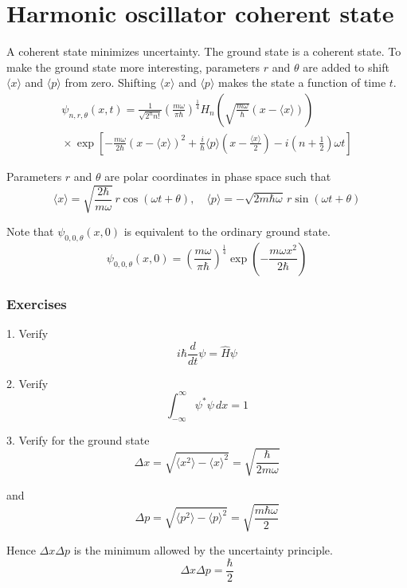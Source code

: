 

\section*{Harmonic oscillator coherent state}

A coherent state minimizes uncertainty.
The ground state is a coherent state.
To make the ground state more interesting, parameters $r$ and $\theta$ are added
to shift $\langle x\rangle$ and $\langle p\rangle$ from zero.
Shifting $\langle x\rangle$ and $\langle p\rangle$ makes the state a function of time $t$.
\begin{multline*}
\psi_{n,r,\theta}(x,t)
=\frac{1}{\sqrt{2^nn!}}
\left(\frac{m\omega}{\pi\hbar}\right)^\frac{1}{4}
H_n\left(\sqrt{\frac{m\omega}{\hbar}}\left(x-\langle x\rangle\right)\right)
\\{}\times
\exp\left[
-\frac{m\omega}{2\hbar}\left(x-\langle x\rangle\right)^2
+\frac{i}{\hbar}\langle p\rangle\left(x-\frac{\langle x\rangle}{2}\right)
-i\left(n+\frac{1}{2}\right)\omega t
\right]
\end{multline*}

Parameters $r$ and $\theta$ are polar coordinates in phase space such that
\begin{equation*}
\langle x\rangle=\sqrt{\frac{2\hbar}{m\omega}}\,r\cos(\omega t+\theta),\quad
\langle p\rangle=-\sqrt{2m\hbar\omega}\,r\sin(\omega t+\theta)
\end{equation*}

Note that $\psi_{0,0,\theta}(x,0)$ is equivalent to the ordinary ground state.
\begin{equation*}
\psi_{0,0,\theta}(x,0)=\left(\frac{m\omega}{\pi\hbar}\right)^\frac{1}{4}
\exp\left(-\frac{m\omega x^2}{2\hbar}\right)
\end{equation*}

\subsubsection*{Exercises}

1. Verify
\begin{equation*}
i\hbar\frac{d}{dt}\psi=\hat H\psi
\end{equation*}

2. Verify
\begin{equation*}
\int_{-\infty}^\infty\psi^*\psi\,dx=1
\end{equation*}

3. Verify for the ground state
\begin{equation*}
\Delta x=\sqrt{\langle x^2\rangle-\langle x\rangle^2}
=\sqrt{\frac{\hbar}{2m\omega}}
\end{equation*}

and
\begin{equation*}
\Delta p=\sqrt{\langle p^2\rangle-\langle p\rangle^2}
=\sqrt{\frac{m\hbar\omega}{2}}
\end{equation*}

Hence $\Delta x\Delta p$ is the minimum allowed by the uncertainty principle.
\begin{equation*}
\Delta x\Delta p=\frac{\hbar}{2}
\end{equation*}



